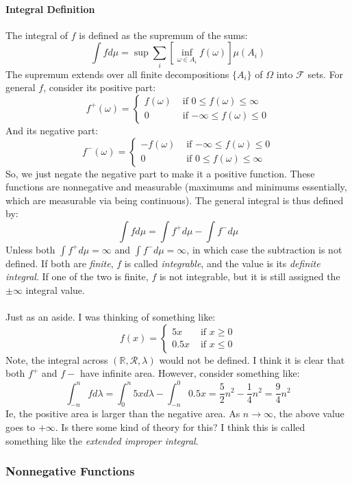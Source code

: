\documentclass[12pt,a4paper]{article}
\newcommand{\1}[1]{\mathbbm{1}\left\{ #1 \right\}}
\newcommand{\R}{\mathbb{R}}
\newcommand{\fcal}{\mathcal{F}}
\newcommand{\rcal}{\mathcal{R}}
\begin{document}
\paragraph{Integral Definition} The integral of $f$ is defined as the supremum of the sums:
$$
	\int f d\mu = \sup \sum_i \left[\inf_{\omega \in A_i} f(\omega)\right] \mu(A_i)
$$
The supremum extends over all finite decompositions $\{A_i\}$ of $\Omega$ into $\fcal$ sets. For general $f$, consider its positive part:
$$
	f^+(\omega) = \begin{cases}
	f(\omega) & \text{ if $0 \leq f(\omega) \leq \infty$}\\
	0 & \text{ if $-\infty \leq f(\omega) \leq 0$}
	\end{cases}
$$
And its negative part:
$$
	f^-(\omega) = \begin{cases}
	-f(\omega) & \text{ if $-\infty \leq f(\omega) \leq 0$}\\
	0 & \text{ if $0 \leq f(\omega) \leq \infty$}
	\end{cases}
$$
So, we just negate the negative part to make it a positive function. These functions are nonnegative and measurable (maximums and minimums essentially, which are measurable via being continuous). The general integral is thus defined by:
$$
	\int f d\mu = \int f^+ d\mu - \int f^- d\mu
$$
Unless both $\int f^+ d\mu = \infty$ and $\int f^- d\mu = \infty$, in which case the subtraction is not defined. If both are \textit{finite}, $f$ is called \textit{integrable}, and the value is its \textit{definite integral}. If one of the two is finite, $f$ is not integrable, but it is still assigned the $\pm \infty$ integral value.
\\\\
Just as an aside. I was thinking of something like:
$$
	f(x) = \begin{cases}
	5x & \text{ if $x \geq 0$}\\
	0.5x & \text{ if $x \leq 0$}
	\end{cases}
$$
Note, the integral across $(\R, \rcal, \lambda)$ would not be defined. I think it is clear that both $f^+$ and $f-$ have infinite area. However, consider something like:
$$
	\int_{-n}^n f d\lambda =
	\int_0^n 5x d\lambda - \int_{-n}^0 0.5x = \frac{5}{2}n^2 - \frac{1}{4}n^2 = \frac{9}{4}n^2
$$
Ie, the positive area is larger than the negative area. As $n \to \infty$, the above value goes to $+\infty$. Is there some kind of theory for this? I think this is called something like the \textit{extended improper integral}.

\subsubsection{Nonnegative Functions}
\end{document}
